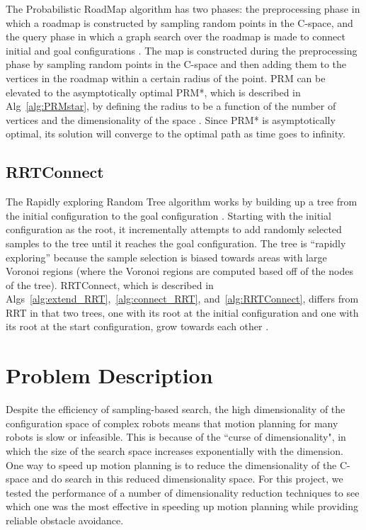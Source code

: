 \documentclass[12pt]{article}
\begin{document}
The Probabilistic RoadMap algorithm has two phases: the preprocessing phase in
which a roadmap is constructed by sampling random points in the C-space, and
the query phase in which a graph search over the roadmap is made to connect
initial and goal configurations \cite{kavraki1996prm}. The map is constructed
during the preprocessing phase by sampling random points in the C-space and
then adding them to the vertices in the roadmap within a certain radius of the
point. PRM can be elevated to the asymptotically optimal PRM*, which is
described in Alg~\ref{alg:PRMstar}, by defining the radius to be a function of
the number of vertices and the dimensionality of the space
\cite{karaman2011sampling}. Since PRM* is asymptotically optimal, its solution
will converge to the optimal path as time goes to infinity.

\subsection{RRTConnect}

The Rapidly exploring Random Tree algorithm works by building up a tree from
the initial configuration to the goal configuration \cite{lavalle1998rrt}.
Starting with the initial configuration as the root, it incrementally attempts
to add randomly selected samples to the tree until it reaches the goal
configuration.  The tree is ``rapidly exploring'' because the sample selection
is biased towards areas with large Voronoi regions (where the Voronoi regions
are computed based off of the nodes of the tree). RRTConnect, which is
described in Algs~\ref{alg:extend_RRT},~\ref{alg:connect_RRT},
and~\ref{alg:RRTConnect}, differs from RRT in that two trees, one with its root
at the initial configuration and one with its root at the start configuration,
grow towards each other \cite{kuffner2000rrt}.

\section{Problem Description}

Despite the efficiency of sampling-based search, the high dimensionality of the
configuration space of complex robots means that motion planning for many
robots is slow or infeasible. This is because of the ``curse of dimensionality",
in which the size of the search space increases exponentially with the
dimension. One way to speed up motion planning is to reduce the dimensionality
of the C-space and do search in this reduced dimensionality space. For this
project, we tested the performance of a number of dimensionality reduction
techniques to see which one was the most effective in speeding up motion
planning while providing reliable obstacle avoidance.
\end{document}

